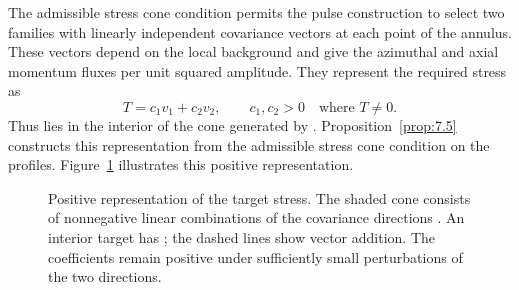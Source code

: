 %
The admissible stress cone condition permits the pulse construction to select two families with
linearly independent covariance vectors  at each point
of the annulus. These vectors depend on the local background and give the azimuthal and axial
momentum fluxes per unit squared amplitude. They represent the required stress as
\[
 T=c_1v_1+c_2v_2,\qquad c_1,c_2>0\quad\text{where }T\neq0.
\]
Thus  lies in the interior of the cone generated by
. Proposition~\ref{prop:7.5} constructs this representation from the
admissible stress cone condition on the profiles. Figure~\ref{fig:4} illustrates this positive
representation.

\begin{figure}[htbp]
 \centering
 \caption{Positive representation of the target stress. The shaded cone consists of nonnegative
 linear combinations of the covariance directions . An interior
 target  has
 ; the dashed lines show vector addition. The coefficients remain
 positive under sufficiently small perturbations of the two directions.}
 \label{fig:4}
\end{figure}

